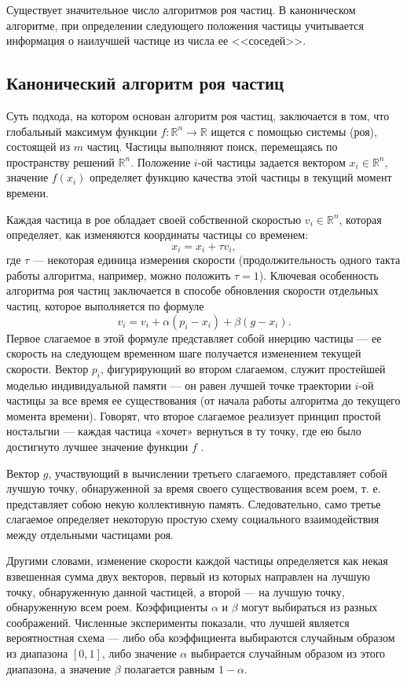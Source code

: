Существует значительное число алгоритмов роя частиц. В каноническом алгоритме, при определении следующего положения частицы учитывается информация о наилучшей частице из числа ее <<соседей>>. 


\subsection{Канонический алгоритм роя частиц}
Суть подхода, на котором основан алгоритм роя частиц, заключается в том, что глобальный максимум функции $ f : \mathbb{R}^n \to  \mathbb{R} $ ищется с помощью системы (роя), состоящей из $m$ частиц. Частицы выполняют поиск, перемещаясь по пространству решений $\mathbb{R}^n$. Положение $i$-ой частицы задается вектором $x_i \in \mathbb{R}^n$,  значение $f(x_i)$ определяет функцию качества этой частицы в текущий момент времени.  

Каждая частица в рое обладает своей собственной скоростью $v_i \in \mathbb{R}^n$, которая определяет, как изменяются координаты частицы со временем:  
$$ x_i = x_i + \tau v_i,$$
где $\tau$ --- некоторая единица измерения скорости (продолжительность одного такта работы алгоритма, например, можно положить $\tau = 1$). Ключевая особенность алгоритма роя частиц заключается в способе обновления скорости отдельных частиц, которое выполняется по формуле 
$$ v_i = v_i + \alpha(p_i - x_i) + \beta(g - x_i). $$  
Первое слагаемое в этой формуле представляет собой инерцию частицы --- ее скорость на следующем временном шаге получается изменением текущей скорости. Вектор $p_i$, фигурирующий во втором слагаемом, служит простейшей моделью индивидуальной памяти --- он равен лучшей точке траектории $i$-ой частицы за все время ее существования (от начала работы алгоритма до текущего момента времени). Говорят, что второе слагаемое реализует принцип простой ностальгии --- каждая частица «хочет» вернуться в ту точку, где ею было достигнуто лучшее значение функции $f$ \cite{leonov}.

Вектор $g$, участвующий в вычислении третьего слагаемого, представляет собой лучшую точку, обнаруженной за время своего существования всем роем, т. е. представляет собою некую коллективную память. Следовательно, само третье слагаемое определяет некоторую простую схему социального взаимодействия между отдельными частицами роя.  

Другими словами, изменение скорости каждой частицы определяется как некая взвешенная сумма двух векторов, первый из которых направлен на лучшую точку, обнаруженную данной частицей, а второй --- на лучшую точку, обнаруженную всем роем. Коэффициенты $\alpha$ и $\beta$ могут выбираться из разных соображений. Численные эксперименты показали, что лучшей является вероятностная схема --- либо оба коэффициента выбираются случайным образом из диапазона $[0, 1] $, либо значение $\alpha$ выбирается случайным образом из этого диапазона, а значение $\beta$ полагается равным $1 - \alpha$.    

